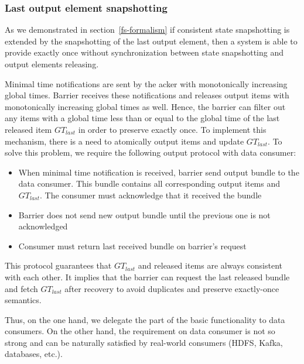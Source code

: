 \subsubsection{Last output element snapshotting}

As we demonstrated in section~\ref{fs-formalism} if consistent state snapshotting is extended by the snapshotting of the last output element, then a system is able to provide exactly once without synchronization between state snapshotting and output elements releasing. 

Minimal time notifications are sent by the acker with monotonically increasing global times. Barrier receives these notifications and releases output items with monotonically increasing global times as well. Hence, the barrier can filter out any items with a global time less than or equal to the global time of the last released item $GT_{last}$ in order to preserve exactly once. To implement this mechanism, there is a need to atomically output items and update $GT_{last}$. To solve this problem, we require the following output protocol with data consumer: 

\begin{itemize}
    \item When minimal time notification is received, barrier send output bundle to the data consumer. This bundle contains all corresponding output items and $GT_{last}$. The consumer must acknowledge that it received the bundle
    \item Barrier does not send new output bundle until the previous one is not acknowledged
    \item Consumer must return last received bundle on barrier's request 
\end{itemize}

This protocol guarantees that $GT_{last}$ and released items are always consistent with each other. It implies that the barrier can request the last released bundle and fetch $GT_{last}$ after recovery to avoid duplicates and preserve exactly-once semantics.

Thus, on the one hand, we delegate the part of the basic functionality to data consumers. On the other hand, the requirement on data consumer is not so strong and can be naturally satisfied by real-world consumers (HDFS, Kafka, databases, etc.). 


